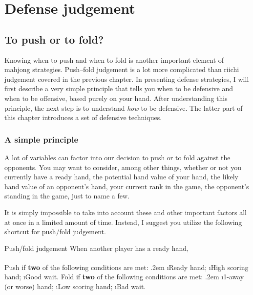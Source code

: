 
\chapter{Defense judgement} \label{ch:defense}
\thispagestyle{fancy}

\section{To push or to fold?}
Knowing when to push and when to fold is another important element of mahjong strategies. Push--fold judgement is a lot more complicated than {\jap riichi} judgement covered in the previous chapter. 
In presenting defense strategies, I will first describe a very simple principle that tells you when to be defensive and when to be offensive, based purely on your hand. After understanding this principle, the next step is to understand \emph{how} to be defensive. The latter part of this chapter introduces a set of defensive techniques. 

\bigskip
\subsection{A simple principle}
A lot of variables can factor into our decision to push or to fold against the opponents. You may want to consider, among other things, whether or not you currently have a ready hand, the potential hand value of your hand, the likely hand value of an opponent's hand, your current rank in the game, the opponent's standing in the game, just to name a few. 

\bigskip
It is simply impossible to take into account these and other important factors all at once in a limited amount of time. 
Instead, I suggest you utilize the following shortcut for push/fold judgement.

\begin{itembox}[c]{Push/fold judgement}
When another player has a ready hand,\\
\\
{\large Push} if {\bf two} of the following conditions are met:
\vspace{-10pt}
\be\itemsep.2em
\i Ready hand;
\i High scoring hand;
\i Good wait.
\ee
\vsps
{\large Fold} if {\bf two} of the following conditions are met:
\vspace{-10pt}
\be\itemsep.2em
\i 1-away (or worse) hand;
\i Low scoring hand;
\i Bad wait.
\ee
\end{itembox}

